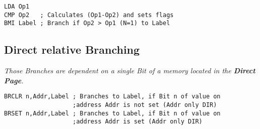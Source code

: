 \begin{lstlisting}
LDA Op1
CMP Op2   ; Calculates (Op1-Op2) and sets flags
BMI Label ; Branch if Op2 > Op1 (N=1) to Label
\end{lstlisting}

\subsection{Direct relative Branching}

\textit{
    Those Branches are dependent on a single Bit of a memory located
    in the \textbf{Direct Page}.
}

\begin{lstlisting}
BRCLR n,Addr,Label ; Branches to Label, if Bit n of value on
                   ;address Addr is not set (Addr only DIR)
BRSET n,Addr,Label ; Branches to Label, if Bit n of value on
                   ;address Addr is set (Addr only DIR)
\end{lstlisting}
